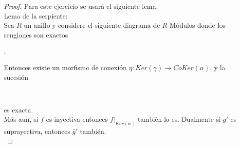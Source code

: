 \documentclass{article}
\begin{document}
\begin{enumerate}[label=\textbf{Ej \arabic*.}]
\begin{proof}
 Para este ejercicio se usará el siguiente lema.\\
Lema de la serpiente:\\
Sea $R$ un anillo y considere el siguiente diagrama de $R$-Módulos donde los renglones son exactos

\begin{center}
.
\end{center}
Entonces existe un morfismo de conexión $\eta\colon Ker(\gamma)\longrightarrow CoKer(\alpha)$, y la sucesión \quad
{}\\
es exacta.\\
Más aun, si $f$ es inyectiva entonces $f|_{Ker(\alpha)}$ también lo es. Dualmente si $g'$ es suprayectiva, entonces $\bar{g}'$ también.\\


\end{proof}
\end{enumerate}
\end{document}
